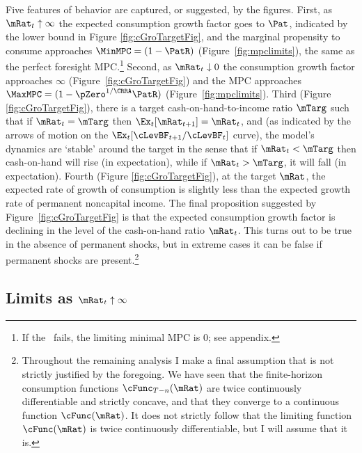 \documentclass[./BufferStockTheory.tex]{subfiles}
\begin{document}
Five features of behavior are captured, or suggested, by the
figures. First, as $\mRat_{t} \uparrow \infty$ the expected
consumption growth factor goes to ${\Pat}$, indicated by the lower
bound in Figure \ref{fig:cGroTargetFig}, and the marginal propensity
to consume approaches $\MinMPC=(1-\PatR)$
(Figure~\ref{fig:mpclimits}), the same as the perfect foresight MPC.\footnote{If the \RIC~fails, the limiting minimal MPC is 0; see appendix.}  Second, as $\mRat_t \downarrow 0$ the consumption
growth factor approaches $\infty$ (Figure~\ref{fig:cGroTargetFig}) and
the MPC approaches $\MaxMPC=(1-\pZero^{1/\CRRA}\PatR)$ (Figure~\ref{fig:mpclimits}).  Third (Figure
\ref{fig:cGroTargetFig}), there is a target cash-on-hand-to-income
ratio $\mTarg$ such that if $\mRat_t = \mTarg$ then $\Ex_t [
{\mRat}_{t+1}] = \mRat_t$, and (as indicated by the arrows of motion
on the $\Ex_{t}[\cLevBF_{t+1}/\cLevBF_{t}]$ curve), the model's dynamics
are `stable' around the target in the sense that if $\mRat_{t} <
\mTarg$ then cash-on-hand will rise (in expectation), while if
$\mRat_{t} > \mTarg$, it will fall (in expectation).  Fourth (Figure
\ref{fig:cGroTargetFig}), at the target $\mRat$, the expected rate of
growth of consumption is slightly less than the expected growth rate
of permanent noncapital income. The final proposition suggested by
Figure~\ref{fig:cGroTargetFig} is that the expected consumption growth
factor is declining in the level of the cash-on-hand ratio
$\mRat_{t}$.  This turns out to be true in the absence of permanent
shocks, but in extreme cases it can be false if permanent shocks are
present.\footnote{Throughout the remaining analysis I make a final
  assumption that is not strictly justified by the foregoing.  We have
  seen that the finite-horizon consumption functions
  $\cFunc_{T-n}(\mRat)$ are twice continuously differentiable and
  strictly concave, and that they converge to a continuous function
  $\cFunc(\mRat)$.  It does not strictly follow that the limiting
  function $\cFunc(\mRat)$ is twice continuously differentiable, but I
  will assume that it is.}

\renewcommand{\figFile}{cGroTargetFig}
\hypertarget{\figFile}{}


\hypertarget{LimitsAsmtToInfty}{}
\subsection{Limits as $\mRat_t \uparrow \infty$}

\label{subsec:LimitsAsmtToInfty}
\end{document}
